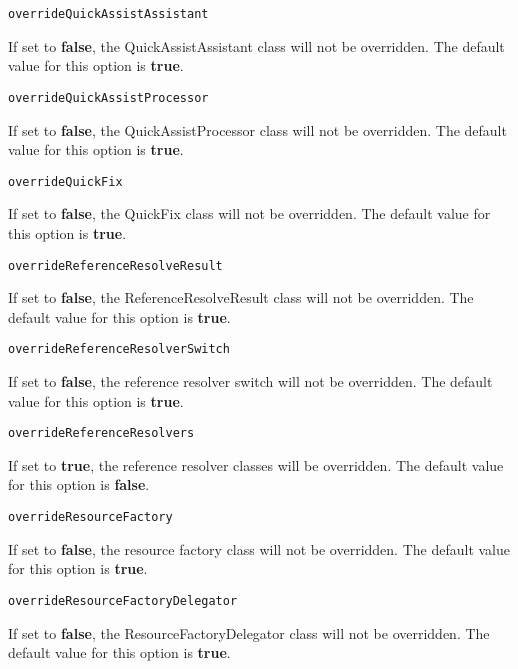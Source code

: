 \noindent\texttt{overrideQuickAssistAssistant}
\begin{myindentpar}{1cm}
If set to \textbf{false}, the QuickAssistAssistant class will not be overridden. The default value for this option is \textbf{true}.
\end{myindentpar}

\noindent\texttt{overrideQuickAssistProcessor}
\begin{myindentpar}{1cm}
If set to \textbf{false}, the QuickAssistProcessor class will not be overridden. The default value for this option is \textbf{true}.
\end{myindentpar}

\noindent\texttt{overrideQuickFix}
\begin{myindentpar}{1cm}
If set to \textbf{false}, the QuickFix class will not be overridden. The default value for this option is \textbf{true}.
\end{myindentpar}

\noindent\texttt{overrideReferenceResolveResult}
\begin{myindentpar}{1cm}
If set to \textbf{false}, the ReferenceResolveResult class will not be overridden. The default value for this option is \textbf{true}.
\end{myindentpar}

\noindent\texttt{overrideReferenceResolverSwitch}
\begin{myindentpar}{1cm}
If set to \textbf{false}, the reference resolver switch will not be overridden. The default value for this option is \textbf{true}.
\end{myindentpar}

\noindent\texttt{overrideReferenceResolvers}
\begin{myindentpar}{1cm}
If set to \textbf{true}, the reference resolver classes will be overridden. The default value for this option is \textbf{false}.
\end{myindentpar}

\noindent\texttt{overrideResourceFactory}
\begin{myindentpar}{1cm}
If set to \textbf{false}, the resource factory class will not be overridden. The default value for this option is \textbf{true}.
\end{myindentpar}

\noindent\texttt{overrideResourceFactoryDelegator}
\begin{myindentpar}{1cm}
If set to \textbf{false}, the ResourceFactoryDelegator class will not be overridden. The default value for this option is \textbf{true}.
\end{myindentpar}

